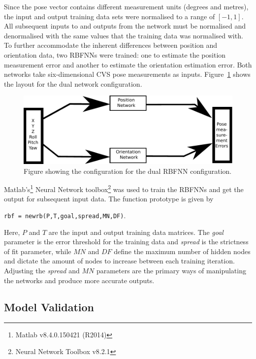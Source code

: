 Since the pose vector contains different measurement units (degrees and metres), the input and output training data sets were normalised to a range of $[-1, 1]$. All subsequent inputs to and outputs from the network must be normalised and denormalised with the same values that the training data was normalised with. To further accommodate the inherent differences between position and orientation data, two RBFNNs were trained: one to estimate the position measurement error and another to estimate the orientation estimation error. Both networks take six-dimensional CVS pose measurements as inputs. Figure~\ref{fig:chap4-two-networks} shows the layout for the dual network configuration.

\begin{figure}
  \centering
  \includegraphics[width=\textwidth]{figures/chapter4/two_network}
  \caption{Figure showing the configuration for the dual RBFNN configuration.}
  \label{fig:chap4-two-networks}
\end{figure}

Matlab's\footnote{Matlab v8.4.0.150421 (R2014)} Neural Network toolbox\footnote{Neural Network Toolbox v8.2.1} was used to train the RBFNNs and get the output for subsequent input data. The function prototype is given by 

\begin{center}
  \verb|rbf = newrb(P,T,goal,spread,MN,DF)|.
\end{center}

Here, $P$ and $T$ are the input and output training data matrices. The \emph{goal} parameter is the error threshold for the training data and \emph{spread} is the strictness of fit parameter, while $\mathit{MN}$ and $\mathit{DF}$ define the maximum number of hidden nodes and dictate the amount of nodes to increase between each training iteration. Adjusting the \emph{spread} and $\mathit{MN}$ parameters are the primary ways of manipulating the networks and produce more accurate outputs. 

\subsection{Model Validation}

